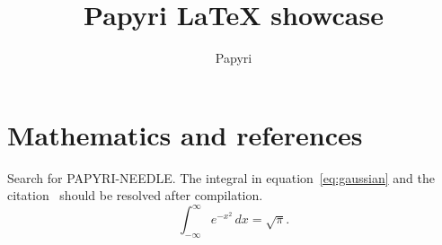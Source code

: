 \documentclass{article}
\title{Papyri LaTeX showcase}
\author{Papyri}
\begin{document}
\maketitle
\tableofcontents

\section{Mathematics and references}\label{sec:math}
Search for PAPYRI-NEEDLE. The integral in equation~\eqref{eq:gaussian} and the citation~\cite{example2024} should be resolved after compilation.
\begin{equation}\label{eq:gaussian}
\int_{-\infty}^{\infty} e^{-x^2}\,dx = \sqrt{\pi}.
\end{equation}





\end{document}
